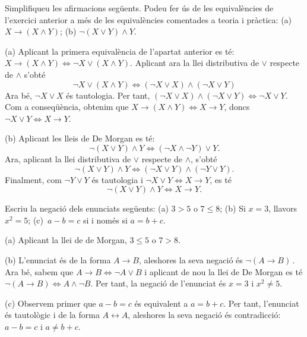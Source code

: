 \begin{exercici}
Simplifiqueu les afirmacions seg\"{u}ents. Podeu fer \'{u}s de les
equival\`{e}ncies de l'exercici anterior a m\'{e}s de les equival\`{e}ncies
comentades a teoria i pr\`{a}ctica: (a) $X\longrightarrow\left(  X\wedge
Y\right)  $; (b) $\lnot\left(  X\vee Y\right)  \wedge Y$.
\end{exercici}

\begin{solucio}
(a) Aplicant la primera equival\`{e}ncia de l'apartat anterior es t\'{e}:
$X\longrightarrow\left(  X\wedge Y\right)  \Longleftrightarrow\lnot
X\vee\left(  X\wedge Y\right)  $. Aplicant ara la llei distributiva de $\vee$
respecte de $\wedge$ s'obt\'{e}%
\[
\lnot X\vee\left(  X\wedge Y\right)  \Longleftrightarrow\left(  \lnot X\vee
X\right)  \wedge\left(  \lnot X\vee Y\right)
\]
Ara b\'{e}, $\lnot X\vee X$ \'{e}s tautologia. Per tant, $\left(  \lnot X\vee
X\right)  \wedge\left(  \lnot X\vee Y\right)  \Longleftrightarrow\lnot X\vee Y
$. Com a conseq\"{u}\`{e}ncia, obtenim que $X\longrightarrow\left(  X\wedge Y\right)
\Longleftrightarrow X\longrightarrow Y$, doncs $\lnot X\vee
Y\Longleftrightarrow X\longrightarrow Y$.

(b) Aplicant les lleis de De Morgan es t\'{e}:%
\[
\lnot\left(  X\vee Y\right)  \wedge Y\Longleftrightarrow\left(  \lnot
X\wedge\lnot Y\right)  \vee Y.
\]
Ara, aplicant la llei distributiva de $\vee$ respecte de $\wedge$, s'obt\'{e}
\[
\lnot\left(  X\vee Y\right)  \wedge Y\Longleftrightarrow\left(  \lnot X\vee
Y\right)  \wedge\left(  \lnot Y\vee Y\right)  .
\]
Finalment, com $\lnot Y\vee Y$ \'{e}s tautologia i $\lnot X\vee
Y\Longleftrightarrow X\longrightarrow Y$, es t\'{e}%
\[
\lnot\left(  X\vee Y\right)  \wedge Y\Longleftrightarrow X\longrightarrow
Y\text{.}%
\]

\end{solucio}

\begin{exercici}
Escriu la negaci\'{o} dels enunciats seg\"{u}ents: (a) $3>5$ o $7\leq8$; (b)
Si $x=3$, llavors $x^{2}=5$; (c)\ $a-b=c$ si i nom\'{e}s si $a=b+c$.
\end{exercici}

\begin{solucio}
(a) Aplicant la llei de de Morgan, $3\leq5$ o $7>8$.

(b) L'enunciat \'{e}s de la forma $A\longrightarrow B$, aleshores la seva
negaci\'{o} \'{e}s $\lnot\left(  A\longrightarrow B\right)  \,$. Ara b\'{e},
sabem que $A\longrightarrow B\Longleftrightarrow\lnot A\vee B$ i aplicant de
nou la llei de De Morgan es t\'{e} $\lnot\left(  A\longrightarrow B\right)
\Longleftrightarrow A\wedge\lnot B$. Per tant, la negaci\'{o} de l'enunciat
\'{e}s $x=3$ i $x^{2}\neq5$.

(c) Observem primer que $a-b=c$ \'{e}s equivalent a $a=b+c$. Per tant,
l'enunciat \'{e}s tautol\`{o}gic i de la forma $A\longleftrightarrow A$,
aleshores la seva negaci\'{o} \'{e}s contradicci\'{o}: $a-b=c$ i $a\neq b+c$.
\end{solucio}

